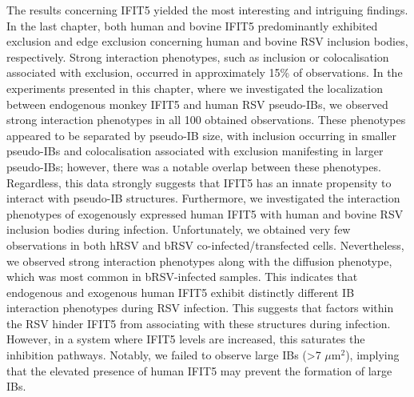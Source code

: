 The results concerning IFIT5 yielded the most interesting and intriguing findings. In the last chapter, both human and bovine IFIT5 predominantly exhibited exclusion and edge exclusion concerning human and bovine RSV inclusion bodies, respectively. Strong interaction phenotypes, such as inclusion or colocalisation associated with exclusion, occurred in approximately 15\% of observations. In the experiments presented in this chapter, where we investigated the localization between endogenous monkey IFIT5 and human RSV pseudo-IBs, we observed strong interaction phenotypes in all 100 obtained observations. These phenotypes appeared to be separated by pseudo-IB size, with inclusion occurring in smaller pseudo-IBs and colocalisation associated with exclusion manifesting in larger pseudo-IBs; however, there was a notable overlap between these phenotypes. Regardless, this data strongly suggests that IFIT5 has an innate propensity to interact with pseudo-IB structures. Furthermore, we investigated the interaction phenotypes of exogenously expressed human IFIT5 with human and bovine RSV inclusion bodies during infection. Unfortunately, we obtained very few observations in both hRSV and bRSV co-infected/transfected cells. Nevertheless, we observed strong interaction phenotypes along with the diffusion phenotype, which was most common in bRSV-infected samples. This indicates that endogenous and exogenous human IFIT5 exhibit distinctly different IB interaction phenotypes during RSV infection. This suggests that factors within the RSV hinder IFIT5 from associating with these structures during infection. However, in a system where IFIT5 levels are increased, this saturates the inhibition pathways. Notably, we failed to observe large IBs (>7 \(\mu \mbox{m}^2\)), implying that the elevated presence of human IFIT5 may prevent the formation of large IBs.

